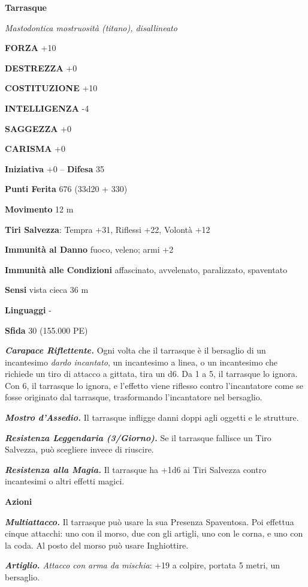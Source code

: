\begin{multicols}{2}
\medskip{}\textbf{Tarrasque}

\emph{Mastodontica mostruosità (titano), disallineato}

\textbf{FORZA} +10

\textbf{DESTREZZA} +0

\textbf{COSTITUZIONE} +10

\textbf{INTELLIGENZA} -4

\textbf{SAGGEZZA} +0

\textbf{CARISMA} +0

\textbf{Iniziativa} +0 -- \textbf{Difesa} 35

\textbf{Punti Ferita} 676 (33d20 + 330)

\textbf{Movimento} 12 m

\textbf{Tiri Salvezza}: Tempra +31, Riflessi +22, Volontà +12

\textbf{Immunità al Danno} fuoco, veleno; armi +2

\textbf{Immunità alle Condizioni} affascinato, avvelenato, paralizzato, spaventato

\textbf{Sensi} vista cieca 36 m

\textbf{Linguaggi} -

\textbf{Sfida} 30 (155.000 PE)

\emph{\textbf{Carapace Riflettente.}} Ogni volta che il tarrasque è il bersaglio di un incantesimo \emph{dardo incantato}, un incantesimo a linea, o un incantesimo che richiede un tiro di attacco a gittata, tira un d6. Da 1 a 5, il tarrasque lo ignora. Con 6, il tarrasque lo ignora, e l'effetto viene riflesso contro l'incantatore come se fosse originato dal tarrasque, trasformando l'incantatore nel bersaglio. 

\emph{\textbf{Mostro d'Assedio.}} Il tarrasque infligge danni doppi agli oggetti e le strutture.

\emph{\textbf{Resistenza Leggendaria (3/Giorno).}} Se il tarrasque fallisce un Tiro Salvezza, può scegliere invece di riuscire.

\emph{\textbf{Resistenza alla Magia.}} Il tarrasque ha +1d6 ai Tiri Salvezza contro incantesimi o altri effetti magici.

\textbf{Azioni}

\emph{\textbf{Multiattacco.}} Il tarrasque può usare la sua Presenza Spaventosa. Poi effettua cinque attacchi: uno con il morso, due con gli artigli, uno con le corna, e uno con la coda. Al posto del morso può usare Inghiottire.

\emph{\textbf{Artiglio.} Attacco con arma da mischia}: +19 a colpire, portata 5 metri, un bersaglio.


\end{multicols}
